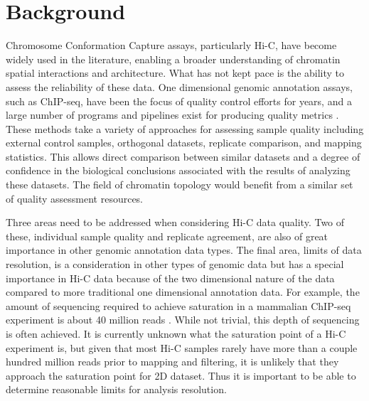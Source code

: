 \section{Background}

Chromosome Conformation Capture assays, particularly Hi-C, have become widely used in the literature, enabling a broader understanding of chromatin spatial interactions and architecture. What has not kept pace is the ability to assess the reliability of these data. One dimensional genomic annotation assays, such as ChIP-seq, have been the focus of quality control efforts for years, and a large number of programs and pipelines exist for producing quality metrics \cite{landt_chip-seq_2012,planet_htseqtools:_2012,diaz_chance:_2012, carroll_impact_2014,marinov_large-scale_2014,qin_chilin:_2016}. These methods take a variety of approaches for assessing sample quality including external control samples, orthogonal datasets, replicate comparison, and mapping statistics. This allows direct comparison between similar datasets and a degree of confidence in the biological conclusions associated with the results of analyzing these datasets. The field of chromatin topology would benefit from a similar set of quality assessment resources.

Three areas need to be addressed when considering Hi-C data quality. Two of these, individual sample quality and replicate agreement, are also of great importance in other genomic annotation data types. The final area, limits of data resolution, is a consideration in other types of genomic data but has a special importance in Hi-C data because of the two dimensional nature of the data compared to more traditional one dimensional annotation data. For example, the amount of sequencing required to achieve saturation in a mammalian ChIP-seq experiment is about 40 million reads \cite{jung_impact_2014}. While not trivial, this depth of sequencing is often achieved. It is currently unknown what the saturation point of a Hi-C experiment is, but given that most Hi-C samples rarely have more than a couple hundred million reads prior to mapping and filtering, it is unlikely that they approach the saturation point for 2D dataset. Thus it is important to be able to determine reasonable limits for analysis resolution.

